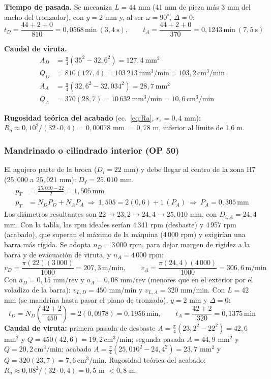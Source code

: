 \documentclass[12pt,a4paper]{article}
\newcommand{\umm}{\,\mathrm{mm}}
\newcommand{\umin}{\,\mathrm{min}}
\newcommand{\umpm}{\,\mathrm{m/min}}
\newcommand{\ucmmin}{\,\mathrm{cm^3/min}}
\begin{document}
\textbf{Tiempo de pasada.} Se mecaniza $L=44$ mm (41 mm de pieza más 3 mm del
ancho del tronzador), con $y=2$ mm y, al ser $\omega=90^\circ$, $\Delta=0$:
\[
	t_D=\frac{44+2+0}{810}=0{,}0568\umin\ (3{,}4\ \text{s}),\qquad
	t_A=\frac{44+2+0}{370}=0{,}1243\umin\ (7{,}5\ \text{s})
\]

\textbf{Caudal de viruta.}
\begin{align*}
	A_D & =\tfrac{\pi}{4}\left(35^2-32{,}6^2\right)=127{,}4\ \text{mm}^2      \\
	Q_D & =810(127{,}4)=103\,213\ \text{mm}^3/\text{min}=103{,}2\ucmmin       \\
	A_A & =\tfrac{\pi}{4}\left(32{,}6^2-32{,}034^2\right)=28{,}7\ \text{mm}^2 \\
	Q_A & =370(28{,}7)=10\,632\ \text{mm}^3/\text{min}=10{,}6\ucmmin
\end{align*}

\textbf{Rugosidad teórica del acabado} (ec.~\ref{eq:Ra}, $r_\varepsilon=0{,}4$
mm):
$R_a\approx 0{,}10^2/(32\cdot0{,}4)=0{,}00078$ mm $=0{,}78$ \textmu m, inferior
al
límite de 1,6 \textmu m.

\subsubsection{Mandrinado o cilindrado interior (OP 50)}

El agujero parte de la broca ($D_i=22$ mm) y debe llegar al centro de la zona
H7 ($25{,}000$ a $25{,}021$ mm): $D_f=25{,}010$ mm.
\begin{align*}
	p_T & =\frac{25{,}010-22}{2}=1{,}505\umm                                                   \\
	p_T & =N_DP_D+N_AP_A\ \Rightarrow\ 1{,}505=2(0{,}6)+1\,(P_A)\ \Rightarrow\ P_A=0{,}305\umm
\end{align*}
Los diámetros resultantes son $22\to23{,}2\to24{,}4\to25{,}010$ mm, con
$D_{i,A}=24{,}4$ mm. Con la tabla, las rpm ideales serían 4\,341 rpm
(desbaste) y 4\,957 rpm (acabado), que superan el máximo de la máquina
(4\,000 rpm) y exigirían una barra más rígida. Se adopta $n_D=3\,000$ rpm, para
dejar margen de rigidez a la barra y de evacuación de viruta, y $n_A=4\,000$ rpm:
\[
	v_D=\frac{\pi(22)(3\,000)}{1000}=207{,}3\umpm,\qquad
	v_A=\frac{\pi(24{,}4)(4\,000)}{1000}=306{,}6\umpm
\]
Con $a_D=0{,}15$ mm/rev y $a_A=0{,}08$ mm/rev (menores que en el exterior por
el voladizo de la barra): $v_{L,D}=450$ mm/min y $v_{L,A}=320$ mm/min. Con $L=42$
mm (se mandrina hasta pasar el plano de tronzado), $y=2$ mm y $\Delta=0$:
\[
	t_D=N_D\left(\frac{42+2}{450}\right)=2(0{,}0978)=0{,}1956\umin,\qquad
	t_A=\frac{42+2}{320}=0{,}1375\umin
\]
\textbf{Caudal de viruta:} primera pasada de desbaste
$A=\frac{\pi}{4}(23{,}2^2-22^2)=42{,}6$ mm$^2$ y $Q=450(42{,}6)=19{,}2\ucmmin$;
segunda pasada $A=44{,}9$ mm$^2$ y $Q=20{,}2\ucmmin$; acabado
$A=\frac{\pi}{4}(25{,}010^2-24{,}4^2)=23{,}7$ mm$^2$ y
$Q=320(23{,}7)=7{,}6\ucmmin$. Rugosidad teórica del acabado:
$R_a\approx0{,}08^2/(32\cdot0{,}4)=0{,}5$ \textmu m $<0{,}8$ \textmu m.
\end{document}

